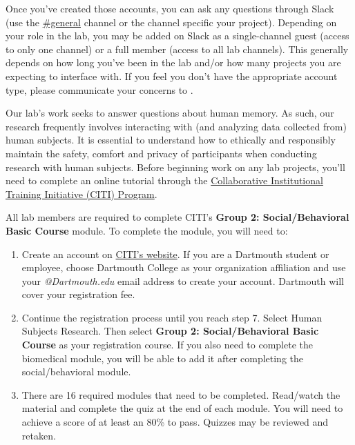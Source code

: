 \documentclass{tufte-book} %
\begin{document}
Once you've created those accounts, you can ask any questions through
Slack (use the
\href{https://context-lab.slack.com/messages/general/}{\#general}
channel or the channel specific your project).  Depending on your role
in the lab, you may be added on Slack as a single-channel guest
(access to only one channel) or a full member (access to all lab
channels).  This generally depends on how long you've been in the lab
and/or how many projects you are expecting to interface with.  If you
feel you don't have the appropriate account type, please communicate
your concerns to \director.


\noindent Our lab's work seeks to answer questions about human memory.
As such, our research frequently involves interacting with (and
analyzing data collected from) human subjects. It is essential to
understand how to ethically and responsibly maintain the safety,
comfort and privacy of participants when conducting research with
human subjects. Before beginning work on any lab projects, you'll need
to complete an online tutorial through the
\href{https://about.citiprogram.org} {Collaborative Institutional
  Training Initiative (CITI) Program}.

\noindent All lab members are required to complete CITI's
\textbf{Group 2: Social/Behavioral Basic Course} module.  To complete
the module, you will need to:
\begin{enumerate}
\item Create an account on \href{https://about.citiprogram.org}{CITI's
    website}.  If you are a Dartmouth student or employee, choose
  Dartmouth College as your organization affiliation and use your
  \textit{@Dartmouth.edu} email address to create your account.
  Dartmouth will cover your registration fee.
\item Continue the registration process until you reach step 7. Select
  Human Subjects Research. Then select \textbf{Group 2:
    Social/Behavioral Basic Course} as your registration course.  If
  you also need to complete the biomedical module, you will be able to
  add it after completing the social/behavioral module.
\item There are 16 required modules that need to be
  completed. Read/watch the material and complete the quiz at the
  end of each module. You will need to achieve a score of at least an
  80\% to pass. Quizzes may be reviewed and retaken.
\end{enumerate}
\end{document}
